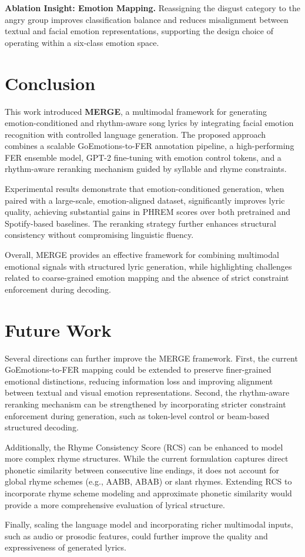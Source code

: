 \documentclass[11pt]{article}
\begin{document}
\textbf{Ablation Insight: Emotion Mapping.}
Reassigning the disgust category to the angry group improves classification 
balance and reduces misalignment between textual and facial emotion representations, 
supporting the design choice of operating within a six-class emotion space.

\section{Conclusion}

This work introduced \textbf{MERGE}, a multimodal framework for generating 
emotion-conditioned and rhythm-aware song lyrics by integrating facial 
emotion recognition with controlled language generation. The proposed 
approach combines a scalable GoEmotions-to-FER annotation pipeline, a 
high-performing FER ensemble model, GPT-2 fine-tuning with emotion control 
tokens, and a rhythm-aware reranking mechanism guided by syllable and rhyme 
constraints.

Experimental results demonstrate that emotion-conditioned generation, when 
paired with a large-scale, emotion-aligned dataset, significantly improves 
lyric quality, achieving substantial gains in PHREM scores over both pretrained 
and Spotify-based baselines. The reranking strategy further enhances structural 
consistency without compromising linguistic fluency.

Overall, MERGE provides an effective framework for combining multimodal 
emotional signals with structured lyric generation, while highlighting 
challenges related to coarse-grained emotion mapping and the absence of 
strict constraint enforcement during decoding.

\section{Future Work}

Several directions can further improve the MERGE framework. First, the current 
GoEmotions-to-FER mapping could be extended to preserve finer-grained emotional 
distinctions, reducing information loss and improving alignment between textual 
and visual emotion representations. Second, the rhythm-aware reranking mechanism 
can be strengthened by incorporating stricter constraint enforcement during generation, 
such as token-level control or beam-based structured decoding.

Additionally, the Rhyme Consistency Score (RCS) can be enhanced to model more 
complex rhyme structures. While the current formulation captures direct phonetic 
similarity between consecutive line endings, it does not account for global rhyme 
schemes (e.g., AABB, ABAB) or slant rhymes. Extending RCS to incorporate rhyme scheme 
modeling and approximate phonetic similarity would provide a more comprehensive evaluation 
of lyrical structure.

Finally, scaling the language model and incorporating richer multimodal inputs, such as audio 
or prosodic features, could further improve the quality and expressiveness of generated lyrics.

\newpage

\end{document}
